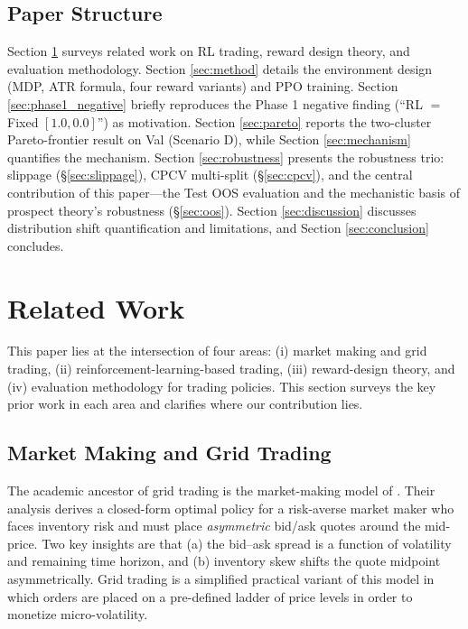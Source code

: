 \documentclass[11pt, a4paper]{article}
\begin{document}
\subsection{Paper Structure}
\label{sec:intro_structure}

Section \ref{sec:related} surveys related work on RL trading, reward design
theory, and evaluation methodology. Section \ref{sec:method} details the
environment design (MDP, ATR formula, four reward variants) and PPO training.
Section \ref{sec:phase1_negative} briefly reproduces the Phase 1 negative
finding (``RL $=$ Fixed $[1.0, 0.0]$'') as motivation. Section \ref{sec:pareto}
reports the two-cluster Pareto-frontier result on Val (Scenario D), while
Section \ref{sec:mechanism} quantifies the mechanism. Section
\ref{sec:robustness} presents the robustness trio: slippage
(\S\ref{sec:slippage}), CPCV multi-split (\S\ref{sec:cpcv}), and the central
contribution of this paper---the Test OOS evaluation and the mechanistic basis
of prospect theory's robustness (\S\ref{sec:oos}). Section \ref{sec:discussion}
discusses distribution shift quantification and limitations, and Section
\ref{sec:conclusion} concludes.

\section{Related Work}
\label{sec:related}

This paper lies at the intersection of four areas: (i) market making and grid
trading, (ii) reinforcement-learning-based trading, (iii) reward-design theory,
and (iv) evaluation methodology for trading policies. This section surveys the
key prior work in each area and clarifies where our contribution lies.

\subsection{Market Making and Grid Trading}
\label{sec:related_grid}

The academic ancestor of grid trading is the market-making model of
\citet{avellaneda2008market}. Their analysis derives a closed-form optimal
policy for a risk-averse market maker who faces inventory risk and must place
\emph{asymmetric} bid/ask quotes around the mid-price. Two key insights are
that (a) the bid--ask spread is a function of volatility and remaining time
horizon, and (b) inventory skew shifts the quote midpoint asymmetrically. Grid
trading is a simplified practical variant of this model in which orders are
placed on a pre-defined ladder of price levels in order to monetize
micro-volatility.
\end{document}
